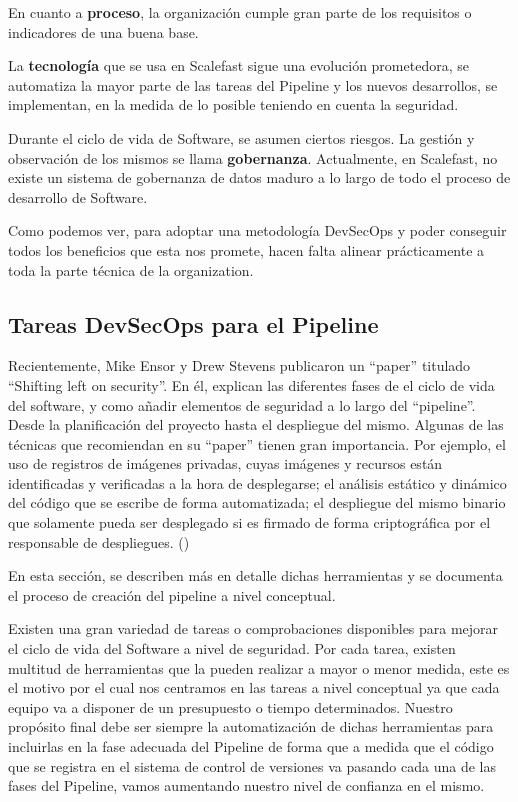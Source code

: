 \documentclass[12pt]{report} %
\begin{document}
En cuanto a \textbf{proceso}, la organización cumple gran parte de los
requisitos o indicadores de una buena base.

La \textbf{tecnología} que se usa en Scalefast sigue una evolución prometedora,
se automatiza la mayor parte de las tareas del Pipeline y los nuevos
desarrollos, se implementan, en la medida de lo posible teniendo en cuenta la
seguridad.

Durante el ciclo de vida de Software, se asumen ciertos riesgos.
La gestión y observación de los mismos se llama \textbf{gobernanza}.
Actualmente, en Scalefast, no existe un sistema de gobernanza de datos maduro a
lo largo de todo el proceso de desarrollo de Software.

Como podemos ver, para adoptar una metodología \gls{DevSecOps} y poder conseguir
todos los beneficios que esta nos promete, hacen falta alinear prácticamente a 
toda la parte técnica de la organization.


\subsection{Tareas DevSecOps para el Pipeline}

Recientemente, Mike Ensor y Drew Stevens publicaron un ``paper'' titulado
``Shifting left on security''.  En él, explican las diferentes fases de el ciclo
de vida del software, y como añadir elementos de seguridad a lo largo del
``pipeline''.  Desde la planificación del proyecto hasta el despliegue del
mismo.  Algunas de las técnicas que recomiendan en su ``paper'' tienen gran
importancia. Por ejemplo,  el uso de registros de imágenes privadas, cuyas
imágenes y recursos están identificadas y verificadas a la hora de desplegarse;
el análisis estático y dinámico del código que se escribe de forma automatizada;
el despliegue del mismo binario que solamente pueda ser desplegado si es firmado
de forma criptográfica por el responsable de despliegues. (\cite{Ensor2021})

En esta sección, se describen más en detalle dichas herramientas y se documenta
el proceso de creación del pipeline a nivel conceptual.

Existen una gran variedad de tareas o comprobaciones disponibles para mejorar el
ciclo de vida del Software a nivel de seguridad.  Por cada tarea, existen
multitud de herramientas que la pueden realizar a mayor o menor medida, este es
el motivo por el cual nos centramos en las tareas a nivel conceptual ya que cada
equipo va a disponer de un presupuesto o tiempo determinados.  Nuestro propósito
final debe ser siempre la automatización de dichas herramientas para incluirlas
en la fase adecuada del Pipeline de forma que a medida que el código que se
registra en el sistema de control de versiones va pasando cada una de las fases
del Pipeline, vamos aumentando nuestro nivel de confianza en el mismo.
\end{document}
